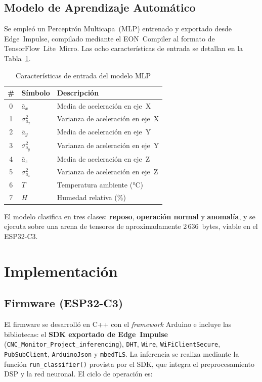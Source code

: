 \documentclass[journal,transmag]{IEEEtran}
\begin{document}
\subsection{Modelo de Aprendizaje Autom\'atico}

Se emple\'o un Perceptr\'on Multicapa~(MLP) entrenado y exportado desde Edge~Impulse, compilado mediante el EON~Compiler al formato de TensorFlow~Lite~Micro. Las ocho caracter\'isticas de entrada se detallan en la Tabla~\ref{tab:features}.

\begin{table}[!t]
\caption{Caracter\'isticas de entrada del modelo MLP}
\label{tab:features}
\centering
\renewcommand{\arraystretch}{1.2}
\begin{tabular}{cll}
\toprule
\textbf{\#} & \textbf{S\'imbolo} & \textbf{Descripci\'on} \\
\midrule
0 & $\bar{a}_x$      & Media de aceleraci\'on en eje~X \\
1 & $\sigma^2_{a_x}$ & Varianza de aceleraci\'on en eje~X \\
2 & $\bar{a}_y$      & Media de aceleraci\'on en eje~Y \\
3 & $\sigma^2_{a_y}$ & Varianza de aceleraci\'on en eje~Y \\
4 & $\bar{a}_z$      & Media de aceleraci\'on en eje~Z \\
5 & $\sigma^2_{a_z}$ & Varianza de aceleraci\'on en eje~Z \\
6 & $T$              & Temperatura ambiente (°C) \\
7 & $H$              & Humedad relativa (\%) \\
\bottomrule
\end{tabular}
\end{table}

El modelo clasifica en tres clases: \textbf{reposo}, \textbf{operaci\'on normal} y \textbf{anomal\'ia}, y se ejecuta sobre una arena de tensores de aproximadamente 2\,636~bytes, viable en el ESP32-C3.


\section{Implementaci\'on}

\subsection{Firmware (ESP32-C3)}

El firmware se desarroll\'o en C++ con el \textit{framework} Arduino e incluye
las bibliotecas: el \textbf{SDK exportado de Edge~Impulse}
(\texttt{CNC\_Monitor\_Project\_inferencing}), \texttt{DHT}, \texttt{Wire},
\texttt{WiFiClientSecure}, \texttt{PubSubClient}, \texttt{ArduinoJson} y
\texttt{mbedTLS}. La inferencia se realiza mediante la funci\'on
\texttt{run\_classifier()} provista por el SDK, que integra el preprocesamiento
DSP y la red neuronal. El ciclo de operaci\'on es:
\end{document}
